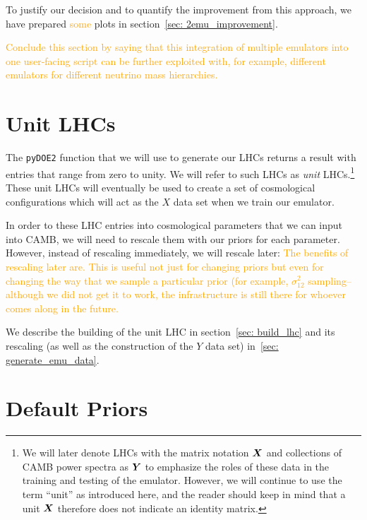 To justify our decision and to quantify the improvement from this approach, we
have prepared \textcolor{orange}{some} plots in section~\ref{sec: 2emu_improvement}.

\textcolor{orange}{Conclude this section by saying that this integration of multiple emulators into one user-facing script can be further exploited with, for example, different emulators for different neutrino mass hierarchies.}

\section{Unit LHCs}
\label{sec: lhc_flow_chart}

The \verb|pyDOE2| function that we will use to generate our LHCs
returns a result with entries that range from zero to unity. We will refer
to such LHCs as \textit{unit} LHCs.\footnote{We will later denote LHCs with 
the matrix notation $\bm{X}$ and collections of CAMB power spectra as
$\bm{Y}$ to
emphasize the roles of these data in the training and testing of the emulator. 
However, we will continue to use the term ``unit'' as introduced here, and 
the reader should keep in mind that a unit $\bm{X}$ therefore does not
indicate an identity matrix.} These unit LHCs will eventually be used 
to create a set of cosmological configurations which will act as the $X$ data 
set when we train our emulator.

In order to these LHC entries into cosmological parameters that we can input 
into CAMB, we will need to rescale them with our priors for each parameter.
However, instead of rescaling immediately, we will rescale later: 
\textcolor{orange}{The benefits of rescaling later are. This is useful not
just for changing priors but even for changing the way that we sample a
particular prior (for example, $\sigma_{12}^2$ sampling--although we did not
get it to work, the infrastructure is still there for whoever comes along in
the future.}
 
We describe the building of the unit LHC in section~\ref{sec: build_lhc}
and its rescaling (as well as the construction of the $Y$ data set) 
in~\ref{sec: generate_emu_data}.


\section{Default Priors}
\label{sec: default_priors}


